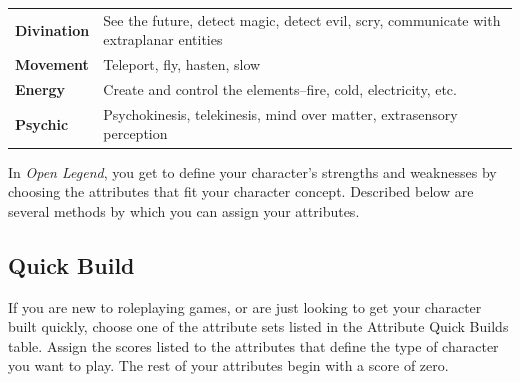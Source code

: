 \documentclass[12pt]{report}
\begin{document}
\begin{longtable}[c]{@{}ll@{}}
\begin{minipage}[t]{0.03\columnwidth}\raggedright\strut
\textbf{Divination}
\strut\end{minipage} &
\begin{minipage}[t]{0.03\columnwidth}\raggedright\strut
See the future, detect magic, detect evil, scry, communicate with
extraplanar entities
\strut\end{minipage}\tabularnewline
\begin{minipage}[t]{0.03\columnwidth}\raggedright\strut
\textbf{Movement}
\strut\end{minipage} &
\begin{minipage}[t]{0.03\columnwidth}\raggedright\strut
Teleport, fly, hasten, slow
\strut\end{minipage}\tabularnewline
\begin{minipage}[t]{0.03\columnwidth}\raggedright\strut
\textbf{Energy}
\strut\end{minipage} &
\begin{minipage}[t]{0.03\columnwidth}\raggedright\strut
Create and control the elements--fire, cold, electricity, etc.
\strut\end{minipage}\tabularnewline
\begin{minipage}[t]{0.03\columnwidth}\raggedright\strut
\textbf{Psychic}
\strut\end{minipage} &
\begin{minipage}[t]{0.03\columnwidth}\raggedright\strut
Psychokinesis, telekinesis, mind over matter, extrasensory perception
\strut\end{minipage}\tabularnewline
\bottomrule
\end{longtable}

In \emph{Open Legend}, you get to define your character's strengths and
weaknesses by choosing the attributes that fit your character concept.
Described below are several methods by which you can assign your
attributes.

\subsection{Quick Build}\label{quick-build}

If you are new to roleplaying games, or are just looking to get your
character built quickly, choose one of the attribute sets listed in the
Attribute Quick Builds table. Assign the scores listed to the attributes
that define the type of character you want to play. The rest of your
attributes begin with a score of zero.
\end{document}

